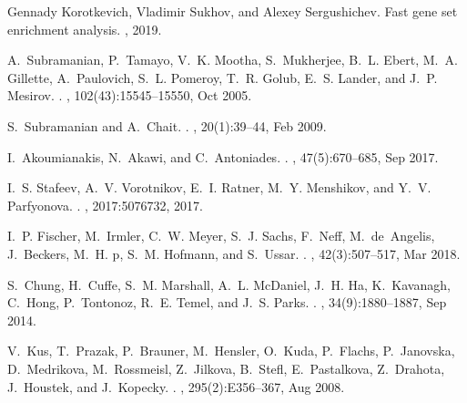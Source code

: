 \documentclass[
]{article}
\begin{document}
\begin{thebibliography}{100}
Gennady Korotkevich, Vladimir Sukhov, and Alexey Sergushichev.
\newblock Fast gene set enrichment analysis.
, 2019.

A.~Subramanian, P.~Tamayo, V.~K. Mootha, S.~Mukherjee, B.~L. Ebert, M.~A.
  Gillette, A.~Paulovich, S.~L. Pomeroy, T.~R. Golub, E.~S. Lander, and J.~P.
  Mesirov.
.
, 102(43):15545--15550, Oct 2005.

S.~Subramanian and A.~Chait.
.
, 20(1):39--44, Feb 2009.

I.~Akoumianakis, N.~Akawi, and C.~Antoniades.
.
, 47(5):670--685, Sep 2017.

I.~S. Stafeev, A.~V. Vorotnikov, E.~I. Ratner, M.~Y. Menshikov, and Y.~V.
  Parfyonova.
.
, 2017:5076732, 2017.

I.~P. Fischer, M.~Irmler, C.~W. Meyer, S.~J. Sachs, F.~Neff, M.~de~Angelis,
  J.~Beckers, M.~H. p, S.~M. Hofmann, and S.~Ussar.
.
, 42(3):507--517, Mar 2018.

S.~Chung, H.~Cuffe, S.~M. Marshall, A.~L. McDaniel, J.~H. Ha, K.~Kavanagh,
  C.~Hong, P.~Tontonoz, R.~E. Temel, and J.~S. Parks.
.
, 34(9):1880--1887, Sep 2014.

V.~Kus, T.~Prazak, P.~Brauner, M.~Hensler, O.~Kuda, P.~Flachs, P.~Janovska,
  D.~Medrikova, M.~Rossmeisl, Z.~Jilkova, B.~Stefl, E.~Pastalkova, Z.~Drahota,
  J.~Houstek, and J.~Kopecky.
.
, 295(2):E356--367, Aug 2008.


\end{thebibliography}
\end{document}
